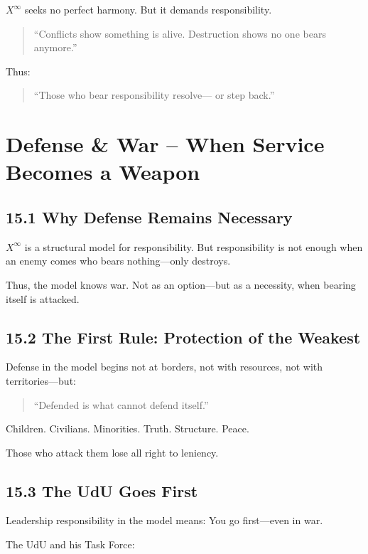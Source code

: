 \documentclass[12pt,a4paper]{book}
\begin{document}
$X^\infty$ seeks no perfect harmony.  
But it demands responsibility.

\begin{quote}
“Conflicts show something is alive.  
Destruction shows no one bears anymore.”  
\end{quote}

Thus:

\begin{quote}
“Those who bear responsibility resolve—  
or step back.”  
\end{quote}

\chapter{Defense \& War – When Service Becomes a Weapon}

\section*{15.1 Why Defense Remains Necessary}

$X^\infty$ is a structural model for responsibility.  
But responsibility is not enough  
when an enemy comes who bears nothing—only destroys.

Thus, the model knows war.  
Not as an option—but as a necessity,  
when bearing itself is attacked.

\section*{15.2 The First Rule: Protection of the Weakest}

Defense in the model begins not at borders, not with resources,  
not with territories—but:

\begin{quote}
“Defended is what cannot defend itself.”  
\end{quote}

Children. Civilians. Minorities.  
Truth. Structure. Peace.

Those who attack them lose all right to leniency.

\section*{15.3 The UdU Goes First}

Leadership responsibility in the model means:  
You go first—even in war.

The UdU and his Task Force:
\end{document}
